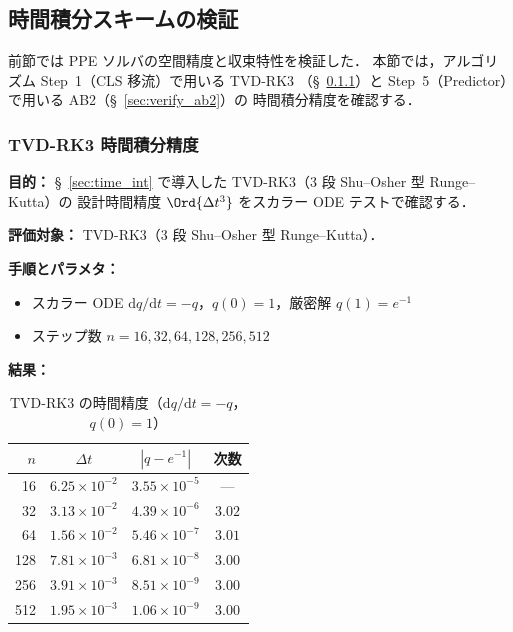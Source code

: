 %

\subsection{時間積分スキームの検証}
\label{sec:verify_time}

前節では PPE ソルバの空間精度と収束特性を検証した．
本節では，アルゴリズム Step~1（CLS 移流）で用いる TVD-RK3
（§~\ref{sec:verify_tvd_rk3}）と
Step~5（Predictor）で用いる AB2（§~\ref{sec:verify_ab2}）の
時間積分精度を確認する．


\subsubsection{TVD-RK3 時間積分精度}
\label{sec:verify_tvd_rk3}

\noindent\textbf{目的：}
§~\ref{sec:time_int} で導入した TVD-RK3（3 段 Shu--Osher 型 Runge--Kutta）の
設計時間精度 $\Ord{\Delta t^3}$ をスカラー ODE テストで確認する．

\noindent\textbf{評価対象：}
TVD-RK3（3 段 Shu--Osher 型 Runge--Kutta）．

\noindent\textbf{手順とパラメタ：}
\begin{itemize}[noitemsep]
  \item スカラー ODE $\mathrm{d}q/\mathrm{d}t = -q$，$q(0)=1$，厳密解 $q(1) = e^{-1}$
  \item ステップ数 $n = 16, 32, 64, 128, 256, 512$
\end{itemize}

\noindent\textbf{結果：}

\begin{table}[htbp]
\centering
\caption{TVD-RK3 の時間精度（$\mathrm{d}q/\mathrm{d}t=-q$，$q(0)=1$）}
\label{tab:tvd_rk3}
\renewcommand{\arraystretch}{1.3}
\begin{tabular}{rc cc}
\toprule
$n$ & $\Delta t$ & $|q - e^{-1}|$ & 次数 \\
\midrule
 16 & $6.25 \times 10^{-2}$ & $3.55 \times 10^{-5}$  & ---    \\
 32 & $3.13 \times 10^{-2}$ & $4.39 \times 10^{-6}$  & $3.02$ \\
 64 & $1.56 \times 10^{-2}$ & $5.46 \times 10^{-7}$  & $3.01$ \\
128 & $7.81 \times 10^{-3}$ & $6.81 \times 10^{-8}$  & $3.00$ \\
256 & $3.91 \times 10^{-3}$ & $8.51 \times 10^{-9}$  & $3.00$ \\
512 & $1.95 \times 10^{-3}$ & $1.06 \times 10^{-9}$  & $3.00$ \\
\bottomrule
\end{tabular}
\end{table}

